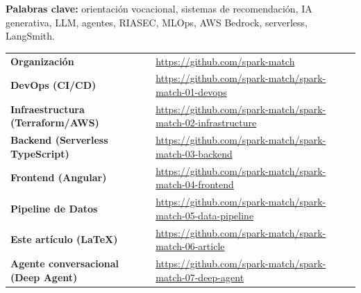 \vspace{0.5cm}
\noindent\textbf{Palabras clave:} orientaci\'on vocacional, sistemas de recomendaci\'on, IA generativa, LLM, agentes, RIASEC, MLOps, AWS Bedrock, serverless, LangSmith.

\newpage

\begin{tcolorbox}[title=Repositorios y recursos del proyecto, breakable, colback=blue!2, colframe=blue!40!black]
\renewcommand{\arraystretch}{1.4}
\begin{tabularx}{\linewidth}{@{} >{\bfseries}l >{\raggedright\arraybackslash}X @{}}
    Organizaci\'on & \url{https://github.com/spark-match} \\
    DevOps (CI/CD) & \url{https://github.com/spark-match/spark-match-01-devops} \\
    Infraestructura (Terraform/AWS) & \url{https://github.com/spark-match/spark-match-02-infrastructure} \\
    Backend (Serverless TypeScript) & \url{https://github.com/spark-match/spark-match-03-backend} \\
    Frontend (Angular) & \url{https://github.com/spark-match/spark-match-04-frontend} \\
    Pipeline de Datos & \url{https://github.com/spark-match/spark-match-05-data-pipeline} \\
    Este art\'iculo (LaTeX) & \url{https://github.com/spark-match/spark-match-06-article} \\
    Agente conversacional (Deep Agent) & \url{https://github.com/spark-match/spark-match-07-deep-agent} \\
\end{tabularx}
\end{tcolorbox}












\newpage
\renewcommand{\refname}{Referencias bibliogr\'aficas}



\newpage
\addtocounter{section}{1}


